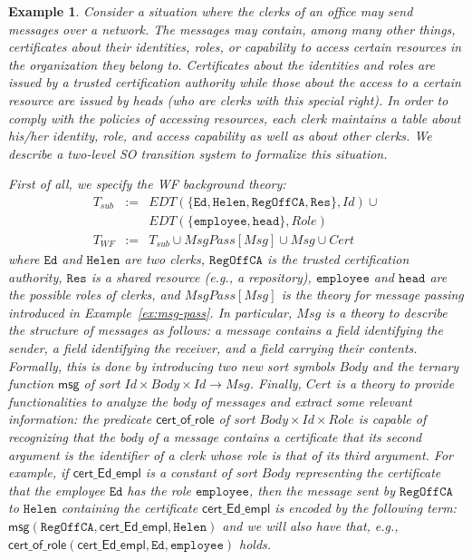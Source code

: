 \documentclass[conference]{IEEEtran}
\newtheorem{example}{Example}
\begin{document}
\begin{example}
  \label{ex:SO-appl}
  Consider a situation where the clerks of an office may send
  messages over a network.  The messages may contain, among many other
  things, certificates about their identities, roles, or capability to
  access certain resources in the organization they belong to.
  Certificates about the identities and roles are issued by a trusted
  certification authority while those about the access to a certain
  resource are issued by heads (who are clerks with this special
  right).  In order to comply with the policies of accessing
  resources, each clerk maintains a table about his/her identity,
  role, and access capability as well as about other clerks.  We
  describe a two-level SO transition system to formalize this
  situation.  

  First of all, we specify the WF background theory:
  \begin{eqnarray*}
    T_\mathit{sub} & := & \mathit{EDT}(\{ \mathtt{Ed}, \mathtt{Helen}, \mathtt{RegOffCA}, \mathtt{Res}\}, \mathit{Id}) \cup \\
           &    & \mathit{EDT}(\{ \mathtt{employee}, \mathtt{head}\}, \mathit{Role})  \\
    T_\mathit{WF}  & := & T_\mathit{sub} \cup  \mathit{MsgPass}[\mathit{Msg}] \cup \mathit{Msg} \cup \mathit{Cert} 
  \end{eqnarray*}
  where $\mathtt{Ed}$ and $\mathtt{Helen}$ are two clerks,
  $\mathtt{RegOffCA}$ is the trusted certification authority, $\mathtt{Res}$
  is a shared resource (e.g., a repository), $\mathtt{employee}$ and
  $\mathtt{head}$ are the possible roles of clerks, and
  $\mathit{MsgPass}[\mathit{Msg}]$ is the theory for message passing
  introduced in Example~\ref{ex:msg-pass}.  In particular,
  $\mathit{Msg}$ is a theory to describe the structure of messages as
  follows: a message contains a field identifying the sender, a field
  identifying the receiver, and a field carrying their contents.
  Formally, this is done by introducing two new sort symbols
  $\mathit{Body}$ and the ternary function $\mathsf{msg}$ of sort
  $\mathit{Id} \times \mathit{Body}\times \mathit{Id} \rightarrow
  \mathit{Msg}$.  Finally, $\mathit{Cert}$ is a theory to provide
  functionalities to analyze the body of messages and extract some
  relevant information: the predicate $\mathsf{cert\_of\_role}$ of
  sort $\mathit{Body}\times \mathit{Id} \times \mathit{Role}$ is
  capable of recognizing that the body of a message contains a
  certificate that its second argument is the identifier of a clerk
  whose role is that of its third argument.  For example, if
  $\mathsf{cert\_Ed\_empl}$ is a constant of sort $\mathit{Body}$
  representing the certificate that the employee $\mathtt{Ed}$ has the
  role $\mathtt{employee}$, then the message sent by $\mathtt{RegOffCA}$ to
  $\mathtt{Helen}$ containing the certificate
  $\mathsf{cert\_Ed\_empl}$ is encoded by the following term:
  $\mathsf{msg}(\mathtt{RegOffCA}, \mathsf{cert\_Ed\_empl}, \mathtt{Helen})$
  and we will also have that, e.g., 
  $\mathsf{cert\_of\_role}(\mathsf{cert\_Ed\_empl}, \mathtt{Ed},
  \mathtt{employee})$ holds.


\end{example}
\end{document}
